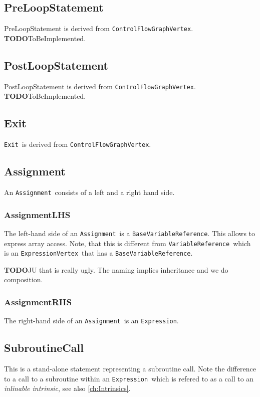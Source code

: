 \documentclass{book}
\newcommand{\todo}{{\bf TODO}}
\newcommand{\Assignment}{{\tt Assignment}}
\newcommand{\BaseVariableReference}{{\tt BaseVariableReference}}
\newcommand{\ControlFlowGraphVertex}{{\tt ControlFlowGraphVertex}}
\newcommand{\Exit}{{\tt Exit}}
\newcommand{\Expression}{{\tt Expression}}
\newcommand{\ExpressionVertex}{{\tt ExpressionVertex}}
\newcommand{\VariableReference}{{\tt VariableReference}}
\begin{document}
\subsection{PreLoopStatement}
\label{ssec:PreLoopStatement}

PreLoopStatement is derived from \ControlFlowGraphVertex.
\todo ToBeImplemented.

\subsection{PostLoopStatement}
\label{ssec:PostLoopStatement}

PostLoopStatement is derived from \ControlFlowGraphVertex.
\todo ToBeImplemented.

\subsection{Exit}
\label{ssec:Exit}

\Exit\ is derived from \ControlFlowGraphVertex.

\subsection{Assignment}
\label{ssec:Assignment}

An \Assignment\ consists of a left and a right hand side.

\subsubsection{AssignmentLHS}

The left-hand side of an \Assignment\ is a \BaseVariableReference. 
This allows to express array access.
Note, that this is different from \VariableReference\ which is an 
\ExpressionVertex\ that has a \BaseVariableReference.

\todo JU that is really ugly. The naming implies 
	inheritance and we do composition.

\subsubsection{AssignmentRHS}

The right-hand side of an \Assignment\ is an \Expression.

\subsection{SubroutineCall}
\label{ssec:SubroutineCall}
This is a stand-alone statement representing a subroutine call. 
Note the 
difference to a call to a subroutine within an \Expression\ which is 
refered to as a call to an {\em inlinable intrinsic}, see also \ref{ch:Intrinsics}.
\end{document}
